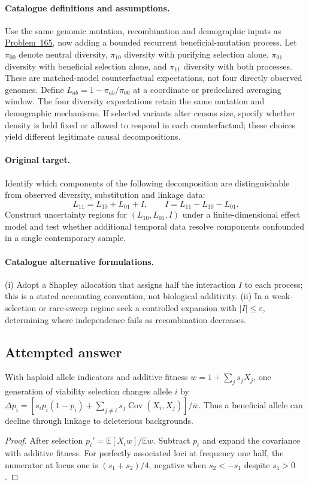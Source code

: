 \documentclass[11pt]{article}
\begin{document}
\paragraph{Catalogue definitions and assumptions.}
Use the same genomic mutation, recombination and demographic inputs as \href{https://we-solve.github.io/problems/genome-wide-background-selection-7614b7fa/}{Problem~165}, now adding a bounded recurrent beneficial-mutation process. Let $\pi_{00}$ denote neutral diversity, $\pi_{10}$ diversity with purifying selection alone, $\pi_{01}$ diversity with beneficial selection alone, and $\pi_{11}$ diversity with both processes. These are matched-model counterfactual expectations, not four directly observed genomes. Define $L_{ab}=1-\pi_{ab}/\pi_{00}$ at a coordinate or predeclared averaging window. The four diversity expectations retain the same mutation and demographic mechanisms. If selected variants alter census size, specify whether density is held fixed or allowed to respond in each counterfactual; these choices yield different legitimate causal decompositions.
\paragraph{Original target.}
Identify which components of the following decomposition are distinguishable from observed diversity, substitution and linkage data:
\[
 L_{11}=L_{10}+L_{01}+I,\qquad
 I=L_{11}-L_{10}-L_{01}.
\]
Construct uncertainty regions for $(L_{10},L_{01},I)$ under a finite-dimensional effect model and test whether additional temporal data resolve components confounded in a single contemporary sample.
\paragraph{Catalogue alternative formulations.}
(i) Adopt a Shapley allocation that assigns half the interaction $I$ to each process; this is a stated accounting convention, not biological additivity. (ii) In a weak-selection or rare-sweep regime seek a controlled expansion with $|I|\le\varepsilon$, determining where independence fails as recombination decreases.
\subsection{Attempted answer}
\begin{proposition}
With haploid allele indicators and additive fitness $w=1+\sum_js_jX_j$, one generation of viability selection changes allele $i$ by $\Delta p_i=[s_ip_i(1-p_i)+\sum_{j\ne i}s_j\operatorname{Cov}(X_i,X_j)]/\bar w$. Thus a beneficial allele can decline through linkage to deleterious backgrounds.
\end{proposition}
\begin{proof}
After selection $p_i\prime=\mathbb{E}[X_iw]/\mathbb{E} w$. Subtract $p_i$ and expand the covariance with additive fitness. For perfectly associated loci at frequency one half, the numerator at locus one is $(s_1+s_2)/4$, negative when $s_2<-s_1$ despite $s_1>0$.
\end{proof}
\end{document}
